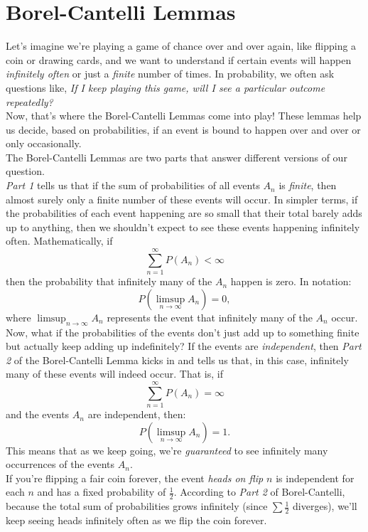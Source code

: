\section{Borel-Cantelli Lemmas}

Let's imagine we’re playing a game of chance over and over again, like flipping a coin or drawing cards, and we want to understand if certain events will happen \textit{infinitely often} or just a \textit{finite} number of times. In probability, we often ask questions like, \textit{If I keep playing this game, will I see a particular outcome repeatedly?}\\

Now, that’s where the Borel-Cantelli Lemmas come into play! These lemmas help us decide, based on probabilities, if an event is bound to happen over and over or only occasionally.\\

The Borel-Cantelli Lemmas are two parts that answer different versions of our question. \\

\textit{Part 1} tells us that if the sum of probabilities of all events \( A_n \) is \textit{finite}, then almost surely only a finite number of these events will occur. In simpler terms, if the probabilities of each event happening are so small that their total barely adds up to anything, then we shouldn’t expect to see these events happening infinitely often. Mathematically, if 
\[
\sum_{n=1}^{\infty} P(A_n) < \infty
\] 
then the probability that infinitely many of the \( A_n \) happen is zero. In notation:
\[
P\left( \limsup_{n \to \infty} A_n \right) = 0,
\]
where \(\limsup_{n \to \infty} A_n\) represents the event that infinitely many of the \( A_n \) occur.\\

Now, what if the probabilities of the events don’t just add up to something finite but actually keep adding up indefinitely? If the events are \textit{independent}, then \textit{Part 2} of the Borel-Cantelli Lemma kicks in and tells us that, in this case, infinitely many of these events will indeed occur. That is, if 
\[
\sum_{n=1}^{\infty} P(A_n) = \infty
\] 
and the events \(A_n\) are independent, then:
\[
P\left( \limsup_{n \to \infty} A_n \right) = 1.
\]
This means that as we keep going, we’re \textit{guaranteed} to see infinitely many occurrences of the events \( A_n \).\\

If you’re flipping a fair coin forever, the event \textit{heads on flip \(n\)} is independent for each \(n\) and has a fixed probability of \(\frac{1}{2}\). According to \textit{Part 2} of Borel-Cantelli, because the total sum of probabilities grows infinitely (since \(\sum \frac{1}{2}\) diverges), we’ll keep seeing heads infinitely often as we flip the coin forever.\\


